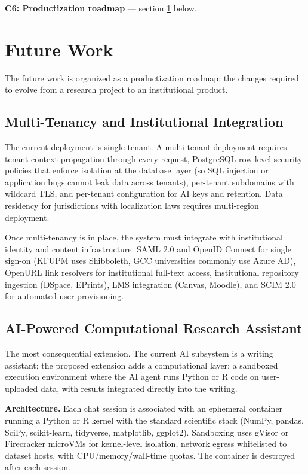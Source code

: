 \textbf{C6: Productization roadmap} — section \ref{sec:future-work} below.

\section{Future Work}
\label{sec:future-work}

The future work is organized as a productization roadmap: the changes required to evolve \sh{} from a research project to an institutional product.

\subsection{Multi-Tenancy and Institutional Integration}
\label{sec:fw-multitenancy}

The current deployment is single-tenant. A multi-tenant deployment requires tenant context propagation through every request, PostgreSQL row-level security policies \cite{aws2023rls} that enforce isolation at the database layer (so SQL injection or application bugs cannot leak data across tenants), per-tenant subdomains with wildcard TLS, and per-tenant configuration for AI keys and retention. Data residency for jurisdictions with localization laws requires multi-region deployment.

Once multi-tenancy is in place, the system must integrate with institutional identity and content infrastructure: SAML 2.0 and OpenID Connect for single sign-on (KFUPM uses Shibboleth, GCC universities commonly use Azure AD), OpenURL link resolvers for institutional full-text access, institutional repository ingestion (DSpace, EPrints), LMS integration (Canvas, Moodle), and SCIM 2.0 for automated user provisioning.

\subsection{AI-Powered Computational Research Assistant}
\label{sec:fw-aicompute}

The most consequential extension. The current AI subsystem is a writing assistant; the proposed extension adds a computational layer: a sandboxed execution environment where the AI agent runs Python or R code on user-uploaded data, with results integrated directly into the writing.

\textbf{Architecture.} Each chat session is associated with an ephemeral container running a Python or R kernel with the standard scientific stack (NumPy, pandas, SciPy, scikit-learn, tidyverse, matplotlib, ggplot2). Sandboxing uses gVisor or Firecracker microVMs for kernel-level isolation, network egress whitelisted to dataset hosts, with CPU/memory/wall-time quotas. The container is destroyed after each session.


